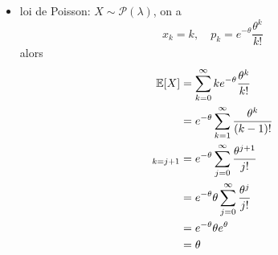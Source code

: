 {\begin{td-sol}[]
\begin{enumerate}
\begin{itemize}
                \item loi de Poisson: \(X \sim \mathcal P(\lambda)\),
                on a
                \begin{equation*}
                    x_k = k, \quad p_k = e^{-\theta} \frac{\theta^k}{k!}
                \end{equation*}
                alors
                \begin{equation*}
                    \begin{aligned}
                        \mathbb{E}\mathopen{}\left[X\right]\mathclose{} 
                        &= \sum_{k=0}^\infty k e^{-\theta} \frac{\theta^k}{k!}\\
                        &= e^{-\theta} \sum_{k=1}^\infty \frac{\theta^k}{(k-1)!}\\
                        {}_{k=j+1}&= e^{-\theta} \sum_{j=0}^\infty \frac{\theta^{j+1}}{j!}\\
                        &= e^{-\theta} \theta \sum_{j=0}^\infty \frac{\theta^j}{j!}\\
                        &= e^{-\theta} \theta e^\theta\\
                        &= \theta
                    \end{aligned}
                \end{equation*}
            \end{itemize}
        \end{enumerate}
    \end{td-sol}
}{}

